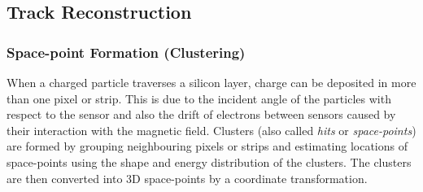 \subsection{Track Reconstruction}
\label{track-reconstruction}




\subsubsection{Space-point Formation (Clustering)}
When a charged particle traverses a silicon layer, charge can be deposited in more than one pixel or strip. This is due to the incident angle of the particles with respect to the sensor and also the drift of electrons between sensors caused by their interaction with the magnetic field. Clusters (also called \textit{hits} or \textit{space-points}) are formed by grouping neighbouring pixels or strips and estimating locations of space-points using the shape and energy distribution of the clusters. The clusters are then converted into 3D space-points by a coordinate transformation.

